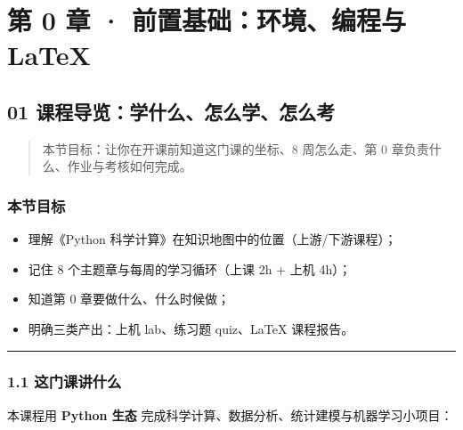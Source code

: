 \chapter{第 0 章 · 前置基础：环境、编程与
LaTeX}\label{ux7b2c-0-ux7ae0-ux524dux7f6eux57faux7840ux73afux5883ux7f16ux7a0bux4e0e-latex}

\section{01
课程导览：学什么、怎么学、怎么考}\label{ux8bfeux7a0bux5bfcux89c8ux5b66ux4ec0ux4e48ux600eux4e48ux5b66ux600eux4e48ux8003}

\begin{quote}
本节目标：让你在开课前知道这门课的坐标、8 周怎么走、第 0
章负责什么、作业与考核如何完成。
\end{quote}

\subsection{本节目标}\label{ux672cux8282ux76eeux6807}

\begin{itemize}
\tightlist
\item
  理解《Python 科学计算》在知识地图中的位置（上游/下游课程）；
\item
  记住 8 个主题章与每周的学习循环（上课 2h + 上机 4h）；
\item
  知道第 0 章要做什么、什么时候做；
\item
  明确三类产出：上机 lab、练习题 quiz、LaTeX 课程报告。
\end{itemize}

\begin{center}\rule{0.5\linewidth}{0.5pt}\end{center}

\subsection{1.1
这门课讲什么}\label{ux8fd9ux95e8ux8bfeux8bb2ux4ec0ux4e48}

本课程用 \textbf{Python 生态}
完成科学计算、数据分析、统计建模与机器学习小项目：

